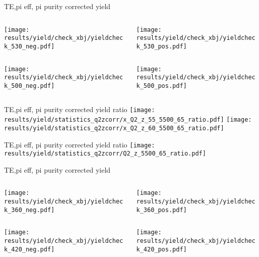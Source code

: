 \begin{frame}{TE,pi eff, pi purity corrected yield}
\begin{columns}
\begin{column}[T]{0.5\textwidth}
\texttt{[image: results/yield/check\_xbj/yieldcheck\_530\_neg.pdf]}
\end{column}
\begin{column}[T]{0.5\textwidth}
\texttt{[image: results/yield/check\_xbj/yieldcheck\_530\_pos.pdf]}
\end{column}
\end{columns}
\begin{columns}
\begin{column}[T]{0.5\textwidth}
\texttt{[image: results/yield/check\_xbj/yieldcheck\_500\_neg.pdf]}
\end{column}
\begin{column}[T]{0.5\textwidth}
\texttt{[image: results/yield/check\_xbj/yieldcheck\_500\_pos.pdf]}
\end{column}
\end{columns}
\end{frame}
\begin{frame}{TE,pi eff, pi purity corrected yield ratio}
\texttt{[image: results/yield/statistics\_q2zcorr/x\_Q2\_z\_55\_5500\_65\_ratio.pdf]}
\texttt{[image: results/yield/statistics\_q2zcorr/x\_Q2\_z\_60\_5500\_65\_ratio.pdf]}
\end{frame}
\begin{frame}{TE,pi eff, pi purity corrected yield ratio}
\texttt{[image: results/yield/statistics\_q2zcorr/Q2\_z\_5500\_65\_ratio.pdf]}
\end{frame}
\begin{frame}{TE,pi eff, pi purity corrected yield}
\begin{columns}
\begin{column}[T]{0.5\textwidth}
\texttt{[image: results/yield/check\_xbj/yieldcheck\_360\_neg.pdf]}
\end{column}
\begin{column}[T]{0.5\textwidth}
\texttt{[image: results/yield/check\_xbj/yieldcheck\_360\_pos.pdf]}
\end{column}
\end{columns}
\begin{columns}
\begin{column}[T]{0.5\textwidth}
\texttt{[image: results/yield/check\_xbj/yieldcheck\_420\_neg.pdf]}
\end{column}
\begin{column}[T]{0.5\textwidth}
\texttt{[image: results/yield/check\_xbj/yieldcheck\_420\_pos.pdf]}
\end{column}
\end{columns}
\end{frame}
